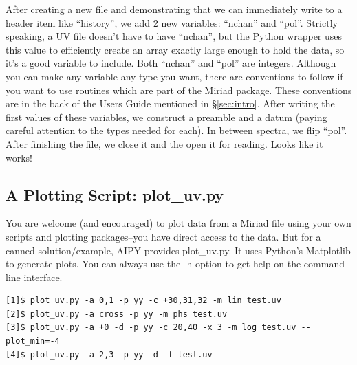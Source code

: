 After creating a new file and demonstrating that we can immediately write to a
header item like ``history'', we add 2 new variables: ``nchan'' and ``pol''.
Strictly speaking, a UV file doesn't have to have ``nchan'', but the Python
wrapper uses this value to efficiently create an array exactly large enough to
hold the data, so it's a good variable to include.  Both ``nchan'' and ``pol''
are integers.  Although you can make any variable any type you want, there are
conventions to follow if you want to use routines which are part of the Miriad
package.  These conventions are in the back of the Users Guide mentioned in
\S\ref{sec:intro}.  After writing the first values of these variables, we
construct a preamble and a datum (paying careful attention to the types needed
for each).  In between spectra, we flip ``pol''.  After finishing the file,
we close it and the open it for reading.  Looks like it works!

\subsection{A Plotting Script: plot\_uv.py}
\label{sec:plot_uv}

You are welcome (and encouraged) to plot data from a Miriad file using your
own scripts and plotting packages--you have direct access to the data.  But
for a canned solution/example, AIPY provides plot\_uv.py.  It uses Python's
Matplotlib to generate plots.  You can always use the -h option to get
help on the command line interface.

\begin{verbatim}
[1]$ plot_uv.py -a 0,1 -p yy -c +30,31,32 -m lin test.uv
[2]$ plot_uv.py -a cross -p yy -m phs test.uv
[3]$ plot_uv.py -a +0 -d -p yy -c 20,40 -x 3 -m log test.uv --plot_min=-4
[4]$ plot_uv.py -a 2,3 -p yy -d -f test.uv
\end{verbatim}

